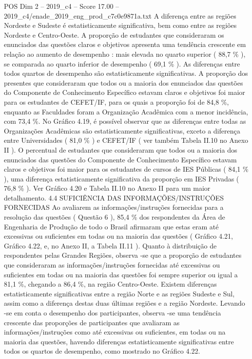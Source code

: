 \begin{textsample}{POS Dim 2 – 2019\_c4 – Score 17.00 – 2019\_c4/enade\_2019\_eng\_prod\_c7c0e9871a.txt}
A diferença entre as regiões Nordeste e Sudeste é estatisticamente significativa, bem como entre as regiões Nordeste e Centro-Oeste.
A proporção de estudantes que consideraram os enunciados das questões claros e objetivos apresenta uma tendência crescente em relação ao aumento de desempenho : mais elevada no quarto superior ( 88,7 \% ), se comparada ao quarto inferior de desempenho ( 69,1 \% ).
As diferenças entre todos quartos de desempenho são estatisticamente significativas.
A proporção dos presentes que consideraram que todos ou a maioria dos enunciados das questões do Componente de Conhecimento Específico estavam claros e objetivos foi maior para os estudantes de CEFET/IF, para os quais a proporção foi de 84,8 \%, enquanto as Faculdades foram a Organização Acadêmica com a menor incidência, com 73,4 \%.
No Gráfico 4.19, é possível observar que as diferenças entre todas as Organizações Acadêmicas são estatisticamente significativas, exceto a diferença entre Universidades ( 81,0 \% ) e CEFET/IF ( ver também Tabela II.10 no Anexo II ).
O percentual de estudantes que consideraram que todos ou a maioria dos enunciados das questões do Componente de Conhecimento Específico estavam claros e objetivos foi maior para os estudantes de cursos de IES Públicas ( 84,1 \% ), uma diferença estatisticamente significativa da proporção em IES Privadas ( 76,8 \% ).
Ver Gráfico 4.20 e Tabela II.10 no Anexo II para um maior detalhamento. 4.4 SUFICIÊNCIA DAS INFORMAÇÕES/INSTRUÇÕES FORNECIDAS Ao avaliarem as informações/instruções fornecidas para a resolução das questões ( Questão 6 ), 85,4 \% dos respondentes da Área de Engenharia de Produção de todo o Brasil afirmaram que estas eram até excessivas ou suficientes em todas ou na maioria das questões ( Gráfico 4.21, Gráfico 4.22, e, no Anexo II, a Tabela II.11 ).
Quanto à distribuição de respondentes pelas Grandes Regiões, observa -se que a proporção de estudantes que consideraram as informações/instruções fornecidas até excessivas ou suficientes em todas ou na maioria das questões foi sempre superior ou igual a 81,1 \%, chegando a 86,4 \%, na região Centro-Oeste.
Existem diferenças estatisticamente significativas entre a região Norte e as regiões Sudeste e Sul, assim como a diferença destas duas últimas regiões e a região Nordeste.
Levando -se em conta o desempenho dos participantes, observa -se uma tendência crescente das proporções de participantes que avaliaram as informações/instruções como até excessivas ou suficientes, em todas ou na maioria das questões, havendo diferenças estatisticamente significativas entre todos os quartos de desempenho, como mostrado no Gráfico 4.22.

\end{textsample}
